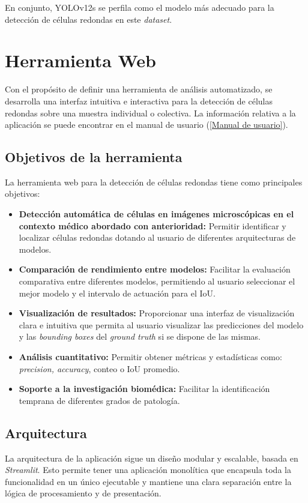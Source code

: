 \documentclass[12pt,a4paper,onecolumn,oneside]{report}
\begin{document}
En conjunto, YOLOv12s se perfila como el modelo más adecuado para la detección de células redondas en este \textit{dataset}. 

\chapter{Herramienta Web} %
\label{Herramienta web}
Con el propósito de definir una herramienta de análisis automatizado, se desarrolla una interfaz intuitiva e interactiva para la detección 
de células redondas sobre una muestra individual o colectiva. La información relativa a la aplicación
se puede encontrar en el manual de usuario (\autoref{Manual de usuario}).
\section{Objetivos de la herramienta}
\label{sec:Objetivos de la herramienta}

La herramienta web para la detección de células redondas tiene como principales objetivos:

\begin{itemize}
  \item{\textbf{Detección automática de células en imágenes microscópicas en el contexto médico abordado con anterioridad:} Permitir identificar
  y localizar células redondas dotando al usuario de diferentes arquitecturas de modelos.}
  \item{\textbf{Comparación de rendimiento entre modelos:} Facilitar la evaluación comparativa entre diferentes modelos,
  permitiendo al usuario seleccionar el mejor modelo y el intervalo de actuación para el IoU.}
  \item{\textbf{Visualización de resultados:} Proporcionar una interfaz de visualización clara e intuitiva que permita al usuario 
  visualizar las predicciones del modelo y las \textit{bounding boxes} del \textit{ground truth} si se dispone de las mismas.}
  \item{\textbf{Análisis cuantitativo:} Permitir obtener métricas y estadísticas como: \textit{precision, accuracy}, conteo o IoU promedio}.
  \item{\textbf{Soporte a la investigación biomédica:} Facilitar la identificación temprana de diferentes grados de patología.} 
\end{itemize}

\section{Arquitectura}
\label{sec:Arquitectura}
La arquitectura de la aplicación sigue un diseño modular y escalable, basada en \textit{Streamlit}. Esto permite tener una aplicación monolítica que encapsula toda la funcionalidad en un único ejecutable y mantiene 
una clara separación entre la lógica de procesamiento y de presentación.
\end{document}
